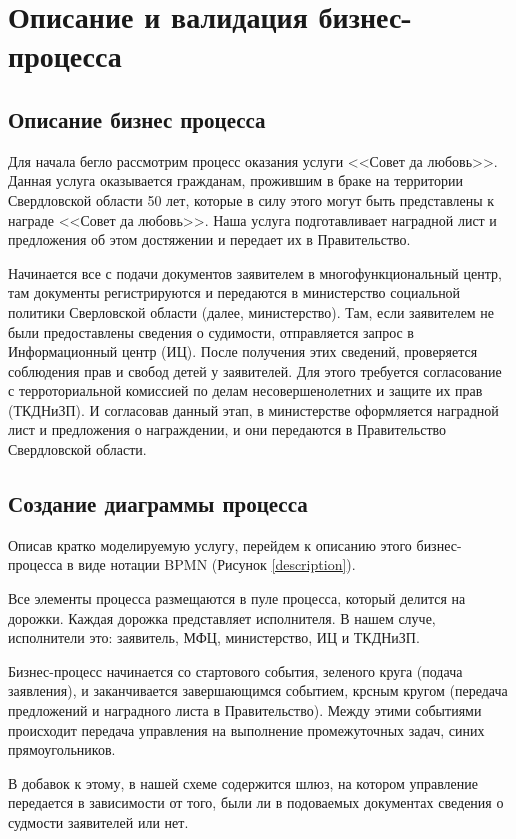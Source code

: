 \chapter{Описание и валидация бизнес-процесса}

\section{Описание бизнес процесса}

Для начала бегло рассмотрим процесс оказания услуги <<Совет
да любовь>>. Данная услуга оказывается гражданам, прожившим
в браке на территории Свердловской области 50 лет, которые
в силу этого могут быть представлены к награде <<Совет да любовь>>.
Наша услуга подготавливает наградной лист и предложения об
этом достяжении и передает их в Правительство.

Начинается все с подачи документов заявителем в многофункциональный
центр, там документы регистрируются и передаются в министерство
социальной политики Сверловской области (далее, министерство).
Там, если заявителем не были предоставлены сведения о судимости,
отправляется запрос в Информационный центр (ИЦ).
После получения этих сведений, проверяется соблюдения прав
и свобод детей у заявителей. Для этого требуется согласование
с терроториальной комиссией по делам несовершенолетних
и защите их прав (ТКДНиЗП). И согласовав данный этап,
в министерстве оформляется наградной лист и предложения
о награждении, и они передаются в Правительство Свердловской
области.

\clearpage
\section{Создание диаграммы процесса}

Описав кратко моделируемую услугу, перейдем к описанию
этого бизнес-процесса в виде нотации BPMN (Рисунок \ref{description}).

Все элементы процесса размещаются в пуле процесса, который
делится на дорожки. Каждая дорожка представляет исполнителя.
В нашем случе, исполнители это: заявитель, МФЦ, министерство,
ИЦ и ТКДНиЗП.

Бизнес-процесс начинается со стартового события,
зеленого круга (подача заявления), и заканчивается
завершающимся событием, крсным кругом (передача предложений и
наградного листа в Правительство). Между этими событиями
происходит передача управления на выполнение промежуточных
задач, синих прямоугольников.

В добавок к этому, в нашей схеме содержится шлюз, на котором
управление передается в зависимости от того, были
ли в подоваемых документах сведения о судмости заявителей
или нет.

